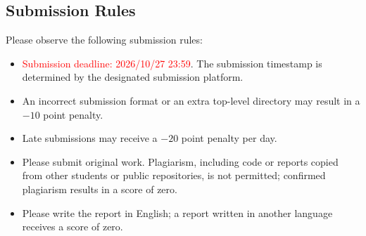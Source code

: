 \documentclass[11pt]{article}
\begin{document}

\subsection{Submission Rules}
Please observe the following submission rules:
\begin{itemize}
\item \textcolor{red}{Submission deadline: 2026/10/27 23:59}. The submission timestamp is determined by the designated submission platform.
\item An incorrect submission format or an extra top-level directory may result in a $-10$ point penalty.
\item Late submissions may receive a $-20$ point penalty per day.
\item Please submit original work. Plagiarism, including code or reports copied from other students or public repositories, is not permitted; confirmed plagiarism results in a score of zero.
\item Please write the report in English; a report written in another language receives a score of zero.
\end{itemize}
\printbibliography
\end{document}
